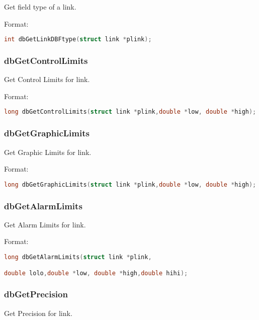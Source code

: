 Get field type of a link.

Format:

\begin{lstlisting}[language=C]
int dbGetLinkDBFtype(struct link *plink);
\end{lstlisting}

\subsubsection{dbGetControlLimits}

Get Control Limits for link.

Format:

\begin{lstlisting}[language=C]
long dbGetControlLimits(struct link *plink,double *low, double *high);
\end{lstlisting}

\subsubsection{dbGetGraphicLimits}

Get Graphic Limits for link.

Format:

\begin{lstlisting}[language=C]
long dbGetGraphicLimits(struct link *plink,double *low, double *high);
\end{lstlisting}

\subsubsection{dbGetAlarmLimits}

Get Alarm Limits for link.

Format:

\begin{lstlisting}[language=C]
long dbGetAlarmLimits(struct link *plink,

double lolo,double *low, double *high,double hihi);
\end{lstlisting}

\subsubsection{dbGetPrecision}

Get Precision for link.

